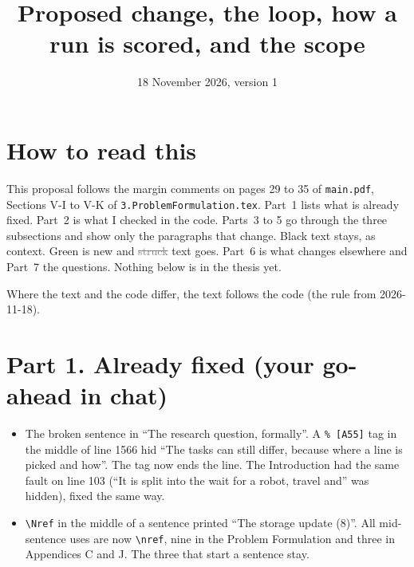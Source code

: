 \documentclass[11pt,a4paper]{article}
\title{Proposed change, the loop, how a run is scored, and the scope}
\date{18 November 2026, version 1}
\newcommand{\new}[1]{\textcolor{newc}{#1}}
\newcommand{\old}[1]{\textcolor{gray}{\sout{#1}}}
\begin{document}
\sloppy
\maketitle

\section*{How to read this}
This proposal follows the margin comments on pages 29 to 35 of
\texttt{main.pdf}, Sections V-I to V-K of \texttt{3.ProblemFormulation.tex}.
Part~1 lists what is already fixed. Part~2 is what I checked in the code.
Parts~3 to 5 go through the three subsections and show only the paragraphs
that change. Black text stays, as context. \new{Green} is new and
\old{struck} text goes. Part~6 is what changes elsewhere and Part~7 the
questions. Nothing below is in the thesis yet.

Where the text and the code differ, the text follows the code (the rule
from 2026-11-18).

\section*{Part 1. Already fixed (your go-ahead in chat)}
\begin{itemize}[nosep]
  \item The broken sentence in ``The research question, formally''. A
        \texttt{\% [A55]} tag in the middle of line 1566 hid ``The tasks can
        still differ, because where a line is picked and how''. The tag now
        ends the line. The Introduction had the same fault on line 103 (``It
        is split into the wait for a robot, travel and'' was hidden), fixed
        the same way.
  \item \texttt{\textbackslash Nref} in the middle of a sentence printed
        ``The storage update (8)''. All mid-sentence uses are now
        \texttt{\textbackslash nref}, nine in the Problem Formulation and three in
        Appendices C and J. The three that start a sentence stay.
\end{itemize}
\end{document}

